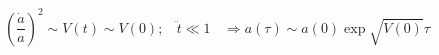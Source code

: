 \begin{equation}
\left (\frac{\dot{a}}{a} \right )^2\sim  V(t)   \sim V(0);~~~~
\ddot{t} \ll 1 ~~~~  \Rightarrow   a(\tau) \sim a(0) \exp{\sqrt{V(0)} \tau}
\end{equation}


